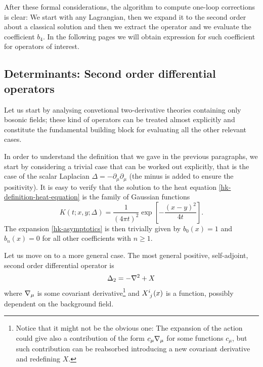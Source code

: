 After these formal considerations, the algorithm to compute one-loop corrections is clear: We start with any Lagrangian, then we expand it to the second order about a classical solution  and then we extract the operator and we evaluate the coefficient $b_4$. In the following pages we will obtain expression for such coefficient for operators of interest.




\subsection{Determinants: Second order differential operators}



Let us start by analysing convetional two-derivative theories containing only bosonic fields; these kind of operators can be treated almost explicitly and constitute the fundamental building block for evaluating all the other relevant cases.


In order to understand the definition that we gave in the previous paragraphs, we start by considering a trivial case that can be worked out explicitly, that is the case of the scalar Laplacian $\Delta= -\partial_\mu\partial_\mu$ (the minus is added to ensure the positivity). It is easy to verify that the solution to the heat equation \eqref{hk-definition-heat-equation} is the family of Gaussian functions
\begin{equation}\label{hk-laplacian}
K \left( t;x,y; \Delta \right)
	=
\frac{1}{(4 \pi t)^{2}} \exp\left[ - \frac{(x-y)^2}{4t} \right].
\end{equation}
The expansion \eqref{hk-asymptotics} is then trivially given by $b_0 (x) = 1$ and $b_n(x) = 0$ for all other coefficients with $n\geq 1.$ 

Let us move on to a more general case. The most general positive, self-adjoint, second order differential operator is
\begin{equation}\label{generic-second-order-diff-op}
\Delta_2 
	=
	- { \mathcal{\nabla} }^2 + X
\end{equation}
where ${ \mathcal{\nabla} }_\mu$ is some covariant derivative\footnote{Notice that it might not be the obvious one: The expansion of the action could give also a contribution of the form $c_\mu { \mathcal{\nabla} }_\mu $ for some functions $c_\mu$, but such contribution can be reabsorbed introducing a new covariant derivative and redefining $X$.} and $X\indices{^i_j}(x)$ is a function, possibly dependent on the background field.

